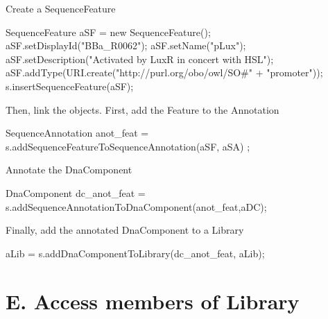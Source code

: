 \begin{DoxyEnumerate}
\item \begin{DoxyParagraph}{Create a SequenceFeature}

\begin{DoxyCode}
SequenceFeature aSF = new SequenceFeature();
aSF.setDisplayId("BBa_R0062");
aSF.setName("pLux");
aSF.setDescription("Activated by LuxR in concert with HSL");
aSF.addType(URI.create("http://purl.org/obo/owl/SO#" + "promoter"));
s.insertSequenceFeature(aSF);
\end{DoxyCode}

\end{DoxyParagraph}

\item \begin{DoxyParagraph}{Then, link the objects. First, add the Feature to the Annotation}

\begin{DoxyCode}
SequenceAnnotation anot_feat = s.addSequenceFeatureToSequenceAnnotation(aSF, aSA)
      ;
\end{DoxyCode}

\end{DoxyParagraph}

\item \begin{DoxyParagraph}{Annotate the DnaComponent}

\begin{DoxyCode}
DnaComponent dc_anot_feat = s.addSequenceAnnotationToDnaComponent(anot_feat,aDC);
      
\end{DoxyCode}

\end{DoxyParagraph}

\item \begin{DoxyParagraph}{Finally, add the annotated DnaComponent to a Library}

\begin{DoxyCode}
aLib = s.addDnaComponentToLibrary(dc_anot_feat, aLib);
\end{DoxyCode}

\end{DoxyParagraph}


 
\end{DoxyEnumerate}\hypertarget{tutorial_E}{}\section{E. Access members of Library}\label{tutorial_E}


